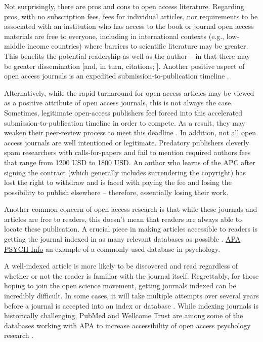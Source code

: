 \documentclass[
  11pt,
]{book}
\begin{document}
Not surprisingly, there are pros and cons to open access literature. Regarding pros, with no subscription fees, fees for individual articles, nor requirements to be associated with an institution who has access to the book or journal \citep{bezjak_open_2018, shah_open_2017} open access materials are free to everyone, including in international contexts (e.g., low-middle income countries) where barriers to scientific literature may be greater. This benefits the potential readership as well as the author -- in that there may be greater dissemination {[}and, in turn, citations; \citet{hagger_developing_2022}{]}. Another positive aspect of open access journals is an expedited submission-to-publication timeline \citep{shah_open_2017}.

Alternatively, while the rapid turnaround for open access articles may be viewed as a positive attribute of open access journals, this is not always the case. Sometimes, legitimate open-access publishers feel forced into this accelerated submission-to-publication timeline in order to compete. As a result, they may weaken their peer-review process to meet this deadline \citep{beall_predatory_2012}. In addition, not all open access journals are well intentioned or legitimate. Predatory publishers cleverly spam researchers with calls-for-papers and fail to mention required authors fees that range from 1200 USD to 1800 USD. An author who learns of the APC after signing the contract (which generally includes surrendering the copyright) has lost the right to withdraw and is faced with paying the fee and losing the possibility to publish elsewhere -- therefore, essentially losing their work.

Another common concern of open access research is that while these journals and articles are free to readers, this doesn't mean that readers are always able to locate these publication. A crucial piece in making articles accessible to readers is getting the journal indexed in as many relevant databases as possible \citep{fortney_getting_2016}. \href{https://www.apa.org/pubs/databases/psycinfois}{APA PSYCH Info} an example of a commonly used database in psychology.

A well-indexed article is more likely to be discovered and read regardless of whether or not the reader is familiar with the journal itself. Regrettably, for those hoping to join the open science movement, getting journals indexed can be incredibly difficult. In some cases, it will take multiple attempts over several years before a journal is accepted into an index or database \citep{fortney_getting_2016, shah_open_2017}. While indexing journals is historically challenging, PubMed and Wellcome Trust are among some of the databases working with APA to increase accessibility of open access psychology research \citep{martone_data_2018}.
\end{document}
